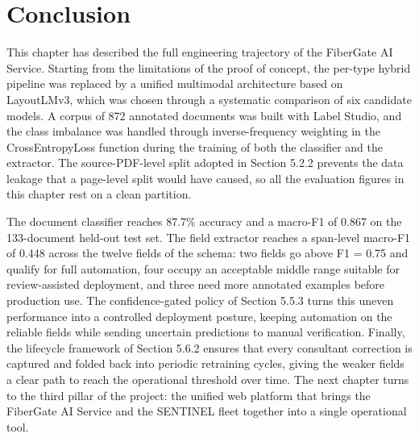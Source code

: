 \section*{Conclusion}

This chapter has described the full engineering trajectory of the FiberGate AI Service. Starting from the limitations of the proof of concept, the per-type hybrid pipeline was replaced by a unified multimodal architecture based on LayoutLMv3, which was chosen through a systematic comparison of six candidate models. A corpus of 872 annotated documents was built with Label Studio, and the class imbalance was handled through inverse-frequency weighting in the CrossEntropyLoss function during the training of both the classifier and the extractor. The source-PDF-level split adopted in Section 5.2.2 prevents the data leakage that a page-level split would have caused, so all the evaluation figures in this chapter rest on a clean partition.

The document classifier reaches 87.7\% accuracy and a macro-F1 of 0.867 on the 133-document held-out test set. The field extractor reaches a span-level macro-F1 of 0.448 across the twelve fields of the schema: two fields go above F1 = 0.75 and qualify for full automation, four occupy an acceptable middle range suitable for review-assisted deployment, and three need more annotated examples before production use. The confidence-gated policy of Section 5.5.3 turns this uneven performance into a controlled deployment posture, keeping automation on the reliable fields while sending uncertain predictions to manual verification. Finally, the lifecycle framework of Section 5.6.2 ensures that every consultant correction is captured and folded back into periodic retraining cycles, giving the weaker fields a clear path to reach the operational threshold over time. The next chapter turns to the third pillar of the project: the unified web platform that brings the FiberGate AI Service and the SENTINEL fleet together into a single operational tool.
